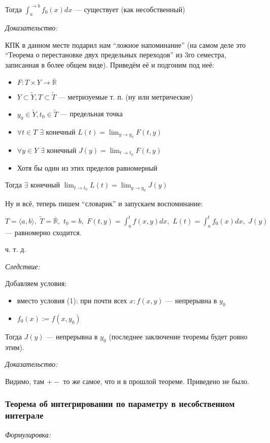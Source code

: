 \documentclass{article}
\def\dbl{\,\,}
\def\rinf{\overline{\mathbb{R}}}
\begin{document}
Тогда $\int_a^{\rightarrow b} f_0(x) dx$ --- существует (как несобственный)

\textit{Доказательство:}

КПК в данном месте подарил нам ``ложное напоминание'' (на самом деле это ``Теорема о перестановке двух предельных переходов'' из 3го семестра, записанная в более общем виде). Приведём её и подгоним под неё:

\begin{itemize}
    \item $F: T \times Y \rightarrow \rinf$
    \item $Y \subset \tilde{Y}, T \subset \tilde{T}$ --- метризуемые т. п. (ну или метрические)
    \item $y_0 \in \tilde{Y}, t_0 \in \tilde{T}$ --- предельная точка
    \item $\forall t \in T \dbl \exists$ конечный $L(t) = \lim_{y \rightarrow y_0} F(t, y)$
    \item $\forall y \in Y \dbl \exists$ конечный $J(y) = \lim_{t \rightarrow t_0} F(t, y)$
    \item Хотя бы один из этих пределов равномерный
\end{itemize}

Тогда $\exists$ конечный $\lim_{t \rightarrow t_0} L(t) = \lim_{y \rightarrow y_0} J(y)$

Ну и всё, теперь пишем ``словарик'' и запускаем воспоминание:

$T = \langle a, b\rangle, \dbl \tilde{T} = \rinf, \dbl t_0 = b, \dbl F(t, y) = \int_a^t f(x, y) dx, \dbl L(t) = \int_a^t f_0(x) dx, \dbl J(y)$ --- равномерно сходится.

ч. т. д. 

\textit{Следствие: }

Добавляем условия:

\begin{itemize}
    \item вместо условия (1): при почти всех $x: f(x, y)$ --- непрерывна в $y_0$
    \item $f_0(x) := f(x, y_0)$
\end{itemize}

Тогда $J(y)$ --- непрерывна в $y_0$ (последнее заключение теоремы будет ровно этим).

\textit{Доказательство:}

Видимо, там $+-$ то же самое, что и в прошлой теореме. Приведено не было.

\subsubsection{Теорема об интегрировании по параметру в несобственном интеграле}
\textit{Формулировка:}
\end{document}
